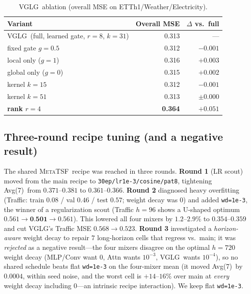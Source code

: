 \documentclass[11pt]{article}
\newcommand{\best}[1]{\textbf{#1}}
\newcommand{\mtsf}{\textsc{MetaTSF}}
\newcommand{\vglg}{\textsc{VGLG}}
\newcommand{\avgseven}{Avg(7)}
\begin{document}
\begin{table}[t]
\centering
\caption{\vglg\ ablation (overall MSE on ETTh1/Weather/Electricity).}
\label{tab:ablation}
\small
\begin{tabular}{@{}lrr@{}}
\toprule
Variant & Overall MSE & $\Delta$ vs.\ full \\
\midrule
\vglg\ (full, learned gate, $r{=}8$, $k{=}31$) & 0.313 & --- \\
fixed gate $g{=}0.5$                & 0.312 & $-0.001$ \\
local only ($g{=}1$)                & 0.316 & $+0.003$ \\
global only ($g{=}0$)               & 0.315 & $+0.002$ \\
kernel $k{=}15$                     & 0.312 & $-0.001$ \\
kernel $k{=}51$                     & 0.313 & $\pm0.000$ \\
\best{rank $r{=}4$}                 & \best{0.364} & \best{$+0.051$} \\
\bottomrule
\end{tabular}
\end{table}

\subsection{Three-round recipe tuning (and a negative result)}

The shared \mtsf\ recipe was reached in three rounds. \textbf{Round 1} (LR scout)
moved from the main recipe to \texttt{30ep/lr1e-3/cosine/pat8}, tightening
\avgseven\ from $0.371$--$0.381$ to $0.361$--$0.366$. \textbf{Round 2} diagnosed
heavy overfitting (Traffic: train $0.08$ / val $0.46$ / test $0.57$; weight decay
was $0$) and added \texttt{wd=1e-3}, the winner of a regularization scout (Traffic
$h{=}96$ shows a U-shaped optimum $0.561{\to}\best{0.501}{\to}0.561$). This lowered
all four mixers by $1.2$--$2.9\%$ to $0.354$--$0.359$ and cut \vglg's Traffic MSE
$0.568{\to}0.523$. \textbf{Round 3} investigated a \emph{horizon-aware} weight
decay to repair $7$ long-horizon cells that regress vs.\ main; it was
\emph{rejected} as a negative result---the four mixers disagree on the optimal
$h{=}720$ weight decay (MLP/Conv want $0$, Attn wants $10^{-3}$, \vglg\ wants
$10^{-4}$), so no shared schedule beats flat \texttt{wd=1e-3} on the four-mixer
mean (it moved \avgseven\ by $0.0004$, within seed noise, and the worst cell is
$+14$--$16\%$ over main at \emph{every} weight decay including $0$---an intrinsic
recipe interaction). We keep flat \texttt{wd=1e-3}.
\end{document}
